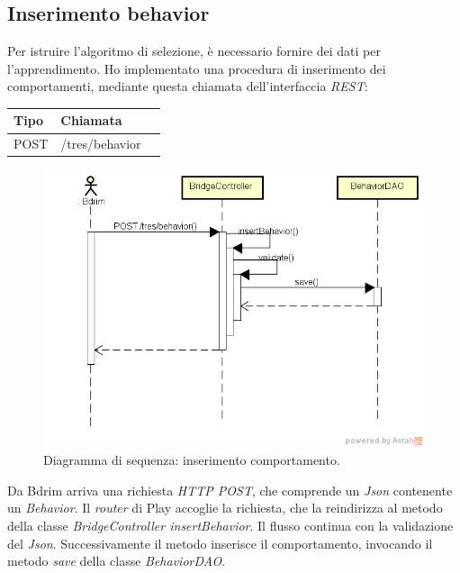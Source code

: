 \subsection{Inserimento behavior}
Per istruire l'algoritmo di selezione, è necessario fornire dei dati per l'apprendimento. Ho implementato una procedura di inserimento dei comportamenti, mediante questa chiamata dell'interfaccia \emph{REST}:
\def\arraystretch{1.5}
\begin{longtable}{|p{2.5cm}|p{5cm}|l|}
\hline
\textbf{Tipo} &	\textbf{Chiamata}	\\\hline
POST	&	/tres/behavior	 \\\hline
\end{longtable}
\begin{figure}[h]
\centering
\includegraphics[scale=0.42]{immagini/DSinsertBeh}
\caption{Diagramma di sequenza: inserimento comportamento.}
\label{fig:seq-inserimentobeh}
\end{figure}
Da Bdrim arriva una richiesta \emph{HTTP POST}, che comprende un \emph{Json} contenente un \emph{Behavior}. Il \emph{router} di Play accoglie la richiesta, che la reindirizza al metodo della classe \emph{BridgeController insertBehavior}. Il flusso continua con la validazione del \emph{Json}. Successivamente il metodo inserisce il comportamento, invocando il metodo \emph{save} della classe \emph{BehaviorDAO}. 


